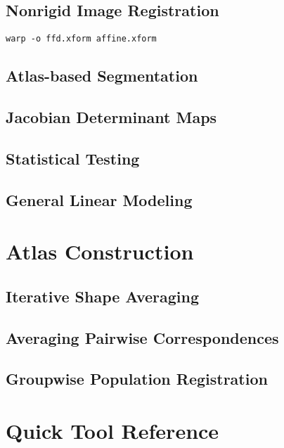 \documentclass{InsightArticle}
\begin{document}
\subsection{Nonrigid Image Registration}

\cite{RuecSonoHaye:1999} \cite{RohlMaur:2003}

\begin{verbatim}
warp -o ffd.xform affine.xform
\end{verbatim}

\subsection{Atlas-based Segmentation}

\subsection{Jacobian Determinant Maps}

\subsection{Statistical Testing}

\subsection{General Linear Modeling}

\section{Atlas Construction}

\subsection{Iterative Shape Averaging}

\subsection{Averaging Pairwise Correspondences}

\subsection{Groupwise Population Registration}

\section{Quick Tool Reference}
\end{document}
